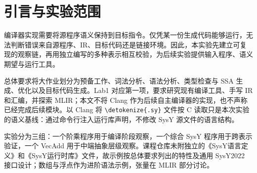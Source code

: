 \documentclass[UTF8,a4paper,10pt,fontset=none]{ctexart}
\newcommand{\code}[1]{{\small\expandafter\nolinkurl\expandafter{\detokenize{#1}}}}
\begin{document}
\begin{abstract}
为给后续自主实现 SysY 编译器建立可验证的语义与目标代码基线，本文首先以阶乘程序观察预处理、词法与语法分析、中间代码生成、优化、汇编和链接的完整过程，并通过宏修改、优化级别及调试选项考察输出变化。随后设计覆盖整数、控制流、递归、作用域、数组与浮点转换的 SysY 程序，独立编写等价 LLVM IR 和 RV64GC 汇编，链接本地 SysY ABI 运行库。在原生与 QEMU 7.0.0 环境中，\TestCases 组输入的九个构建变体共完成 \TestRuns 次验证，均与独立数学期望一致。进阶部分分析官方 AscendNPU IR VecAdd 的 GM/UB 地址空间及搬运、计算语义，并实测社区 MLIR 的 Linalg、SCF、控制流、LLVM 方言到 LLVM IR 的降低链，完成 64 个元素校验。实验区分本机运行证据与 NPU 文档分析，说明运行库 ABI、短路副作用和浮点舍入是跨表示等价验证的关键。

\par\medskip\noindent\textbf{关键词：}SysY；LLVM IR；RISC-V；运行库 ABI；MLIR；渐进降低
\end{abstract}
\tableofcontents
\newpage

\section{引言与实验范围}
编译器实现需要将源程序语义保持到目标指令。仅凭某一份生成代码能够运行，无法判断错误来自源程序、IR、目标代码还是链接环境。因此，本实验先建立可复现的观察链，再用独立编写的多种表示相互校验，为后续实验提供输入程序、语义期望与运行工具。

总体要求将大作业划分为预备工作、词法分析、语法分析、类型检查与 SSA 生成、优化以及目标代码生成。Lab1 对应第一项，要求研究现有编译工具、手写 IR 和汇编，并探索 MLIR；本文不将 Clang 作为后续自主编译器的实现，也不声称已经完成后续模块。以 Clang 将 \code{.sy} 文件按 C 读取只是本次实验的语义基线：通过命令行注入运行库声明，不修改 SysY 源文件的语言结构。

实验分为三组：一个阶乘程序用于编译阶段观察，一个综合 SysY 程序用于跨表示验证，一个 VecAdd 用于中端抽象层级观察。课程仓库未附独立的《SysY语言定义》和《SysY运行时库》文件，故示例按总体要求列出的特性及通用 SysY2022 接口设计；数组与浮点作为进阶语法示例，张量在 MLIR 部分讨论。
\end{document}
